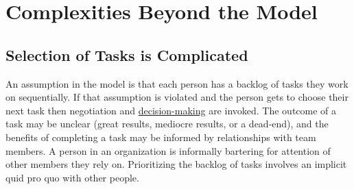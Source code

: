 








\section{Complexities Beyond the Model}

\subsection*{Selection of Tasks is Complicated}

An assumption in the model is that each person has a backlog of tasks they work on sequentially. If that assumption is violated and the person gets to choose their next task then negotiation and 
\href{https://en.wikipedia.org/wiki/Decision-making}{decision-making}
are invoked. The outcome of a task may be unclear (great results, mediocre results, or a dead-end), and the benefits of completing a task may be informed by relationships with team members. A person in an organization is informally bartering for attention of other members they rely on. Prioritizing the backlog of tasks involves an implicit quid pro quo with other people. 

